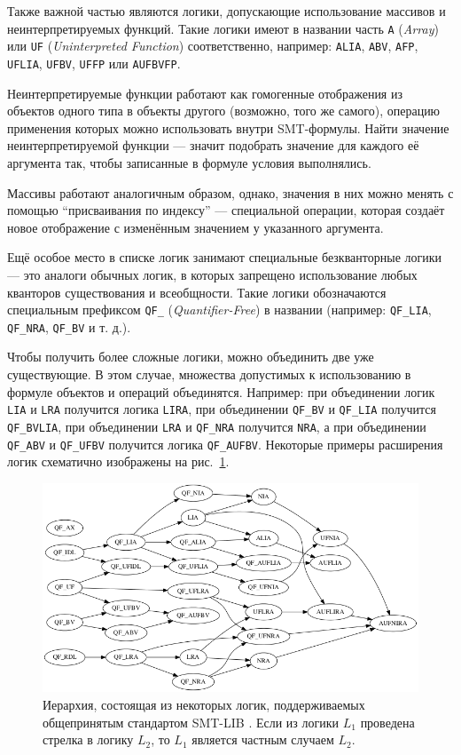 Также важной частью являются логики, допускающие использование массивов и неинтерпретируемых функций. Такие логики имеют в названии часть \texttt{A} (\textit{Array}) или \texttt{UF} (\textit{Uninterpreted Function}) соответственно, например: \texttt{ALIA}, \texttt{ABV}, \texttt{AFP}, \texttt{UFLIA}, \texttt{UFBV}, \texttt{UFFP} или \texttt{AUFBVFP}.

Неинтерпретируемые функции работают как гомогенные отображения из объектов одного типа в объекты другого (возможно, того же самого), операцию применения которых можно использовать внутри SMT-формулы. Найти значение неинтерпретируемой функции --- значит подобрать значение для каждого её аргумента так, чтобы записанные в формуле условия выполнялись.

Массивы работают аналогичным образом, однако, значения в них можно менять с помощью ``присваивания по индексу'' --- специальной операции, которая создаёт новое отображение с изменённым значением у указанного аргумента.

Ещё особое место в списке логик занимают специальные безкванторные логики --- это аналоги обычных логик, в которых запрещено использование любых кванторов существования и всеобщности. Такие логики обозначаются специальным префиксом \texttt{QF\_} (\textit{Quantifier-Free}) в названии (например: \texttt{QF\_LIA}, \texttt{QF\_NRA}, \texttt{QF\_BV} и т. д.).

Чтобы получить более сложные логики, можно объединить две уже существующие. В этом случае, множества допустимых к использованию в формуле объектов и операций объединятся. Например: при объединении логик \texttt{LIA} и \texttt{LRA} получится логика \texttt{LIRA}, при объединении \texttt{QF\_BV} и \texttt{QF\_LIA} получится \texttt{QF\_BVLIA}, при объединении \texttt{LRA} и \texttt{QF\_NRA} получится \texttt{NRA}, а при объединении \texttt{QF\_ABV} и \texttt{QF\_UFBV} получится логика \texttt{QF\_AUFBV}. Некоторые примеры расширения логик схематично изображены на рис.~\ref{smt-logics}.

\begin{figure}[ht]
\begin{center}
    \includegraphics[scale=0.5]{./assets/smt-logics.png}
    \caption{\label{smt-logics} Иерархия, состоящая из некоторых логик, поддерживаемых общепринятым стандартом SMT-LIB \cite{smt-logics-picture}. Если из логики $L_1$ проведена стрелка в логику $L_2$, то $L_1$ является частным случаем $L_2$.}
\end{center}
\end{figure}

